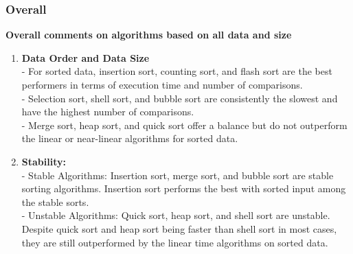 \subsubsection{Overall}
\textbf{Overall comments on algorithms based on all data and size}
\begin{enumerate}
    \item \textbf{Data Order and Data Size} \\
   - For sorted data, insertion sort, counting sort, and flash sort are the best performers in terms of execution time and number of comparisons. \\
   - Selection sort, shell sort, and bubble sort are consistently the slowest and have the highest number of comparisons. \\
   - Merge sort, heap sort, and quick sort offer a balance but do not outperform the linear or near-linear algorithms for sorted data.

    \item \textbf{Stability:} \\
   - Stable Algorithms: Insertion sort, merge sort, and bubble sort are stable sorting algorithms. Insertion sort performs the best with sorted input among the stable sorts. \\
   - Unstable Algorithms: Quick sort, heap sort, and shell sort are unstable. Despite quick sort and heap sort being faster than shell sort in most cases, they are still outperformed by the linear time algorithms on sorted data.
\end{enumerate}

